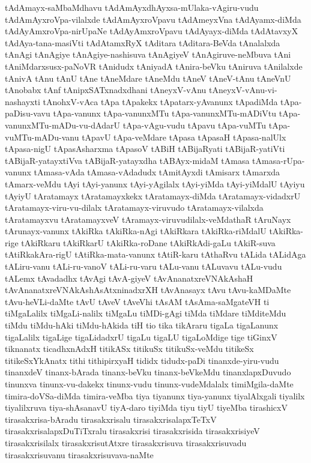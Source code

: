 {tAdAmayx-saMbaMdhavu
tAdAmAyxdhAyxsa-mUlaka-vAgiru-vudu
tAdAmAyxroVpa-vilalxde
tAdAmAyxroVpavu
tAdAmeyxVna
tAdAyamx-diMda
tAdAyAmxroVpa-nirUpaNe
tAdAyAmxroVpavu
tAdAyayx-diMda
tAdAtavxyX
tAdAya-tana-masiVti
tAdAtamxRyX
tAditara
tAditara-BeVda
tAnalalxda
tAnAgi
tAnAgiye
tAnAgiye-nashisuva
tAnAgiyeV
tAnAgiruve-neMbuva
tAni
tAniMdarxsusx-paNoVR
tAnidudx
tAniyadA
tAnira-beVku
tAniruva
tAnilalxde
tAnivA
tAnu
tAnU
tAne
tAneMdare
tAneMdu
tAneV
tAneV-tAnu
tAneVnU
tAnobabx
tAnf
tAnipxSATxnadxdhani
tAneyxV-vAnu
tAneyxV-vAnu-vi-nashayxti
tAnohxV-vAca
tApa
tApakekx
tApatarx-yAvanunx
tApadiMda
tApa-paDisu-vavu
tApa-vanunx
tApa-vanunxMTu
tApa-vanunxMTu-mADiVtu
tApa-vanunxMTu-mADu-vu-dAdarU
tApa-vAgu-vudu
tApavu
tApa-vuMTu
tApa-vuMTu-mADu-vanu
tApavU
tApa-veMdare
tApasa
tApasaH
tApasa-nalUlx
tApasa-nigU
tApasAsharxma
tApasoV
tABiH
tABijaRyati
tABijaR-yatiVti
tABijaR-yatayxtiVva
tABijaR-yatayxdha
tABAyx-midaM
tAmasa
tAmasa-rUpa-vanunx
tAmasa-vAda
tAmasa-vAdadudx
tAmitAyxdi
tAmisarx
tAmarxda
tAmarx-veMdu
tAyi
tAyi-yanunx
tAyi-yAgilalx
tAyi-yiMda
tAyi-yiMdalU
tAyiyu
tAyiyU
tAratamayx
tAratamayxkekx
tAratamayx-diMda
tAratamayx-vidadxrU
tAratamayx-viru-vu-dilalx
tAratamayx-viruvudo
tAratamayx-vilalxda
tAratamayxvu
tAratamayxveV
tAramayx-viruvudilalx-veMdathaR
tAruNayx
tArunayx-vanunx
tAkiRka
tAkiRka-nAgi
tAkiRkara
tAkiRka-riMdalU
tAkiRka-rige
tAkiRkaru
tAkiRkarU
tAkiRka-roDane
tAkiRkAdi-gaLu
tAkiR-suva
tAtiRkakAra-rigU
tAtiRka-mata-vanunx
tAtiR-karu
tAthaRvu
tALida
tALidAga
tALiru-vanu
tALi-ru-vanoV
tALi-ru-varu
tALu-vanu
tALuvavu
tALu-vudu
tALemx
tAvadadhx
tAvAgi
tAvA-giyeV
tAvAnanatxreVNAkAshaH
tAvAnanatxreVNAkAshAsAtxninadxrXH
tAvAnasayx
tAvu
tAvu-kaMDaMte
tAvu-heVLi-daMte
tAvU
tAveV
tAveVhi
tAsAM
tAsAma-saMgateVH
ti
tiMgaLalilx
tiMgaLi-nalilx
tiMgaLu
tiMDi-gAgi
tiMda
tiMdare
tiMditeMdu
tiMdu
tiMdu-hAki
tiMdu-hAkida
tiH
tio
tika
tikAraru
tigaLa
tigaLanunx
tigaLalilx
tigaLige
tigaLidadxrU
tigaLu
tigaLU
tigaLoMdige
tige
tiGinxV
tiknanatx
ticadhxnAdxH
titikASx
titikuSx
titikuSx-veMdu
titikeSx
titikeSxYkAnatx
tithi
tithipirxyaH
tididx
tidudx-paDi
tinanxde-yiru-vudu
tinanxdeV
tinanx-bArada
tinanx-beVku
tinanx-beVkeMdu
tinanxlapxDuvudo
tinunxva
tinunx-vu-dakekx
tinunx-vudu
tinunx-vudeMdalalx
timiMgila-daMte
timira-doVSa-diMda
timira-veMba
tiya
tiyanunx
tiya-yanunx
tiyalAlxgali
tiyalilx
tiyalilxruva
tiya-shAsanavU
tiyA-daro
tiyiMda
tiyu
tiyU
tiyeMba
tirashicxV
tirasakxrisa-bAradu
tirasakxrisalu
tirasakxrisalapxTeTxV
tirasakxrisalapxDuTiTxralu
tirasakxrisi
tirasakxrisida
tirasakxrisiyeV
tirasakxrisilalx
tirasakxrisutAtxre
tirasakxrisuva
tirasakxrisuvadu
tirasakxrisuvanu
tirasakxrisuvava-naMte
}

